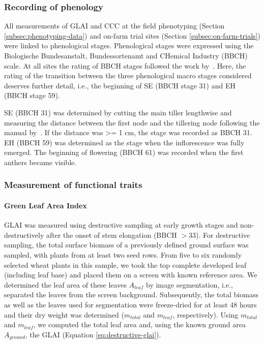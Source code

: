 \subsubsection{Recording of phenology}
\label{subsubsec:phenology-recoding}
All measurements of \gls{GLAI} and \gls{CCC} at the field phenotyping (Section \ref{subsec:phenotyping-data}) and on-farm trial sites (Section \ref{subsec:on-farm-trials}) were linked to phenological stages. Phenological stages were expressed using the Biologische Bundesanstalt, Bundessortenamt and CHemical Industry (BBCH) scale. At all sites the rating of BBCH stages followed the work by~\citet{lancashire_uniform_1991}. Here, the rating of the transition between the three phenological macro stages considered deserves further detail, i.e., the beginning of SE (BBCH stage 31) and EH (BBCH stage 59).

SE (BBCH 31) was determined by cutting the main tiller lengthwise and measuring the distance between the first node and the tillering node following the manual by~\cite{pask_physiological_2012}. If the distance was >= 1 cm, the stage was recorded as BBCH 31. EH (BBCH 59) was determined as the stage when the inflorescence was fully emerged. The beginning of flowering (BBCH 61) was recorded when the first anthers became visible.

\subsubsection{Measurement of functional traits}
\label{subsubsec:trait-measurement}

\paragraph{Green Leaf Area Index}
GLAI was measured using destructive sampling at early growth stages and non-destructively after the onset of stem elongation (BBCH $>$33). For destructive sampling, the total surface biomass of a previously defined ground surface was sampled, with plants from at least two seed rows. From five to six randomly selected wheat plants in this sample, we took the top complete developed leaf (including leaf base) and placed them on a screen with known reference area. We determined the leaf area of these leaves $A_{leaf}$ by image segmentation, i.e., separated the leaves from the screen background. Subsequently, the total biomass as well as the leaves used for segmentation were freeze-dried for at least 48 hours and their dry weight was determined ($m_{total}$ and $m_{leaf}$, respectively). Using $m_{total}$ and $m_{leaf}$, we computed the total leaf area and, using the known ground area $A_{ground}$, the \gls{GLAI} (Equation \ref{eq:destructive-glai}).


